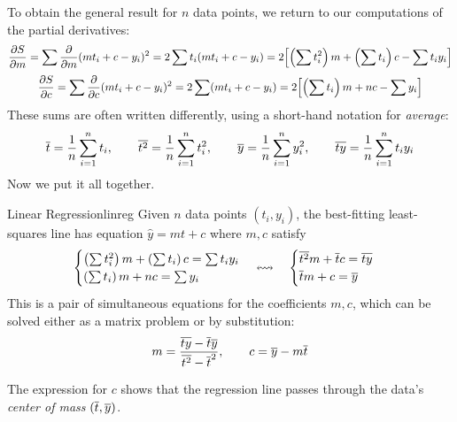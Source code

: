 \goodbreak

To obtain the general result for $n$ data points, we return to our computations of the partial derivatives:
\begin{gather*}
	\partials[S]{m}=\sum\partials{m}(mt_i+c-y_i)^2 =2\sum t_i(mt_i+c-y_i) =2\Bigl[\left(\sum t_i^2\right)m+\left(\sum t_i\right)c-\sum t_iy_i\Bigr]\\[3pt]
	\partials[S]{c}=\sum\partials{c}(mt_i+c-y_i)^2 =2\sum (mt_i+c-y_i) =2\Bigl[\left(\sum t_i\right)m+nc-\sum y_i\Bigr]
\end{gather*}
These sums are often written differently, using a short-hand notation for \emph{average}:
\[
	\cl t=\frac 1n\sum_{i=1}^nt_i,\qquad \cl{t^2}=\frac 1n\sum_{i=1}^nt_i^2,\qquad \cl{y}=\frac 1n\sum_{i=1}^ny_i^2,\qquad \cl{ty}=\frac 1n\sum_{i=1}^nt_iy_i
\]
Now we put it all together.

\begin{thm}{Linear Regression}{linreg}
	Given $n$ data points $(t_i,y_i)$, the best-fitting least-squares line has equation $\hat y=mt+c$ where $m,c$ satisfy
	\[
		\begin{cases}
			\left(\sum t_i^2\right)m+\left(\sum t_i\right)c=\sum t_iy_i\\
			\left(\sum t_i\right)m+nc=\sum y_i
		\end{cases}
		\leftrightsquigarrow \quad
		\begin{cases}
			\cl{t^2}m+\cl tc=\cl{ty}\\
			\cl tm+c=\cl y\\
		\end{cases}
	\]
	This is a pair of simultaneous equations for the coefficients $m,c$, which can be solved either as a matrix problem or by substitution:
	\[
		m=\frac{\cl{ty}-\cl t \cl y}{\cl{t^2}-\cl t^2},\qquad c=\cl y-m\cl t %
	\]
\end{thm}

The expression for $c$ shows that the regression line passes through the data's \emph{center of mass} $(\cl t,\cl y)$.



